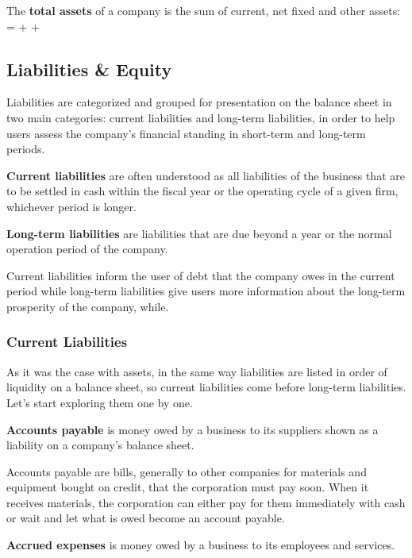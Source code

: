 The \textbf{total assets} of a company is the sum of current, net fixed and other assets:
\bse
{} =  +  + 
\ese
\ed

\subsection{Liabilities \& Equity}

Liabilities are categorized and grouped for presentation on the balance sheet in two main categories: current
liabilities and long-term liabilities, in order to help users assess the company's financial standing in short-term and
long-term periods.

\textbf{Current liabilities} are often understood as all liabilities of the business that are to be settled in cash
within the fiscal year or the operating cycle of a given firm, whichever period is longer.
\ed

\textbf{Long-term liabilities} are liabilities that are due beyond a year or the normal operation period of the company.
\ed

Current liabilities inform the user of debt that the company owes in the current period while long-term liabilities
give users more information about the long-term prosperity of the company, while.

\subsubsection{Current Liabilities}

As it was the case with assets, in the same way liabilities are listed in order of liquidity on a balance sheet, so
current liabilities come before long-term liabilities. Let's start exploring them one by one.

\textbf{Accounts payable} is money owed by a business to its suppliers shown as a liability on a company's balance
sheet.
\ed

Accounts payable are bills, generally to other companies for materials and equipment bought on credit, that the
corporation must pay soon. When it receives materials, the corporation can either pay for them immediately with cash
or wait and let what is owed become an account payable.

\textbf{Accrued expenses} is money owed by a business to its employees and services.
\ed

